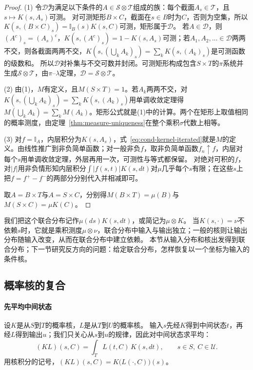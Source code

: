\begin{proof}
(1) 令$\mathcal D$为满足以下条件的$A\in\mathcal S\otimes\mathcal T$组成的族：每个截面$A_s\in\mathcal T$，且$s\mapsto K(s,A_s)$可测。
对可测矩形$B\times C$，截面在$s\in B$时为$C$，否则为空集，所以$K(s,(B\times C)_s)=\mathbb I_B(s)K(s,C)$可测，矩形属于$\mathcal D$。
若$A\in\mathcal D$，则$(A^c)_s=(A_s)^c$，$K(s,(A^c)_s)=1-K(s,A_s)$可测；若$A_1,A_2,\ldots\in\mathcal D$两两不交，则各截面两两不交，$K(s,(\bigcup_kA_k)_s)=\sum_kK(s,(A_k)_s)$是可测函数的级数和。
所以$\mathcal D$对补集与不交可数并封闭。可测矩形构成包含$S\times T$的$\pi$系统并生成$\mathcal S\otimes\mathcal T$，由$\pi$--$\lambda$定理，$\mathcal D=\mathcal S\otimes\mathcal T$。

(2) 由(1)，$M$有定义，且$M(S\times T)=1$。若$A_k$两两不交，对$K(s,(\bigcup_kA_k)_s)=\sum_kK(s,(A_k)_s)$用单调收敛定理得$M(\bigcup_kA_k)=\sum_kM(A_k)$。矩形公式就是(1)中的计算。两个在矩形上取值相同的概率测度，由定理~\ref{thm:measure-uniqueness}在整个乘积$\sigma$代数上相等。

(3) 对$f=\mathbb I_A$，内层积分为$K(s,A_s)$，式~\eqref{eq:cond-kernel-iterated}就是$M$的定义。由线性推广到非负简单函数；对一般非负$f$，取非负简单函数$f_n\uparrow f$，内层对每个$s$用单调收敛定理，外层再用一次，可测性与等式都保留。
对绝对可积的$f$，对$|f|$用非负情形知内层积分$\int|f(s,t)|K(s,dt)$对$\mu$几乎每个$s$有限；在这些$s$上把$f=f^+-f^-$的两部分分别代入并相减即可。

取$A=B\times T$与$A=S\times C$，分别得$M(B\times T)=\mu(B)$与$M(S\times C)=\mu K(C)$。
\end{proof}

我们把这个联合分布记作$\mu(ds)K(s,dt)$，或简记为$\mu\otimes K$。
当$K(s,\cdot)=\nu$不依赖$s$时，它就是乘积测度$\mu\otimes\nu$，联合分布中输入与输出独立；一般的核则让输出分布随输入改变，从而在联合分布中建立依赖。
本节从输入分布和核出发得到联合分布；下一节研究反方向的问题：给定联合分布，怎样恢复以一个坐标为输入的条件核。

\subsection{概率核的复合}

\paragraph{先平均中间状态}
设$K$是从$S$到$T$的概率核，$L$是从$T$到$U$的概率核。
输入$s$先经$K$得到中间状态$t$，再经$L$得到输出$u$；我们只关心从$s$到$u$的规律，因此对中间状态求平均：
\[
  (KL)(s,C)=\int_TL(t,C)\,K(s,dt),\qquad s\in S,\ C\in\mathcal U.
\]
用核积分的记号，$(KL)(s,C)=K\bigl(L(\cdot,C)\bigr)(s)$。


